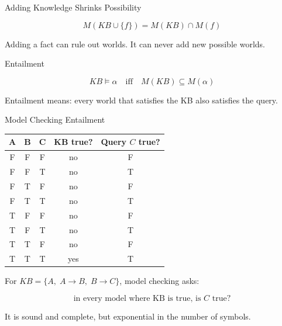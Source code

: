\documentclass[aspectratio=169,11pt]{beamer}
\begin{document}
\begin{frame}{Adding Knowledge Shrinks Possibility}
  \begin{center}
  \end{center}

  \[
    M(KB \cup \{f\}) = M(KB) \cap M(f)
  \]

  Adding a fact can rule out worlds. It can never add new possible worlds.
\end{frame}

\begin{frame}{Entailment}
  \begin{center}
  \end{center}

  \[
    KB \models \alpha
    \quad \text{iff} \quad
    M(KB) \subseteq M(\alpha)
  \]

  Entailment means: every world that satisfies the KB also satisfies the query.
\end{frame}

\begin{frame}{Model Checking Entailment}
  \small
  \begin{tabular}{>{\ttfamily}c>{\ttfamily}c>{\ttfamily}c|c|c}
    \toprule
    A & B & C & KB true? & Query $C$ true? \\
    \midrule
    F & F & F & no & F \\
    F & F & T & no & T \\
    F & T & F & no & F \\
    F & T & T & no & T \\
    T & F & F & no & F \\
    T & F & T & no & T \\
    T & T & F & no & F \\
    T & T & T & yes & T \\
    \bottomrule
  \end{tabular}

  \vspace{0.8em}
  For $KB = \{A,\; A \rightarrow B,\; B \rightarrow C\}$, model checking asks:

  \[
    \text{in every model where KB is true, is } C \text{ true?}
  \]

  It is sound and complete, but exponential in the number of symbols.
\end{frame}
\end{document}
